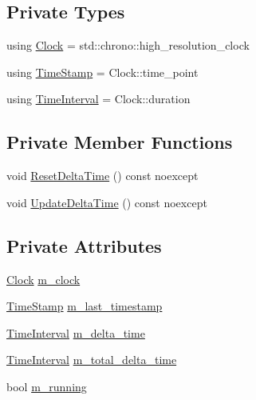 \subsection*{Private Types}
\begin{DoxyCompactItemize}
\item 
using \hyperlink{classmage_1_1_timer_a6d46c5edc40fd404d44d8762c814c5f3}{Clock} = std\+::chrono\+::high\+\_\+resolution\+\_\+clock
\item 
using \hyperlink{classmage_1_1_timer_aff202783fe113efdf539f9dc685a158c}{Time\+Stamp} = Clock\+::time\+\_\+point
\item 
using \hyperlink{classmage_1_1_timer_a5e38d0ad64043ad3622072e7b6637d98}{Time\+Interval} = Clock\+::duration
\end{DoxyCompactItemize}
\subsection*{Private Member Functions}
\begin{DoxyCompactItemize}
\item 
void \hyperlink{classmage_1_1_timer_a5b66b3bfbed7cd4a3ad565abec5c3b02}{Reset\+Delta\+Time} () const noexcept
\item 
void \hyperlink{classmage_1_1_timer_a10f12ad8645e8022a09067f1393c065b}{Update\+Delta\+Time} () const noexcept
\end{DoxyCompactItemize}
\subsection*{Private Attributes}
\begin{DoxyCompactItemize}
\item 
\hyperlink{classmage_1_1_timer_a6d46c5edc40fd404d44d8762c814c5f3}{Clock} \hyperlink{classmage_1_1_timer_aa85148d55792c8cc703918beede17215}{m\+\_\+clock}
\item 
\hyperlink{classmage_1_1_timer_aff202783fe113efdf539f9dc685a158c}{Time\+Stamp} \hyperlink{classmage_1_1_timer_af87b641f17eba20552a7a309dfc3761a}{m\+\_\+last\+\_\+timestamp}
\item 
\hyperlink{classmage_1_1_timer_a5e38d0ad64043ad3622072e7b6637d98}{Time\+Interval} \hyperlink{classmage_1_1_timer_a05eac9cb442358351b0f2861f70e56b9}{m\+\_\+delta\+\_\+time}
\item 
\hyperlink{classmage_1_1_timer_a5e38d0ad64043ad3622072e7b6637d98}{Time\+Interval} \hyperlink{classmage_1_1_timer_a642e43f01ce61c54c89ea116235342e9}{m\+\_\+total\+\_\+delta\+\_\+time}
\item 
bool \hyperlink{classmage_1_1_timer_ac8d975843e5b2199848284de910d3291}{m\+\_\+running}
\end{DoxyCompactItemize}


